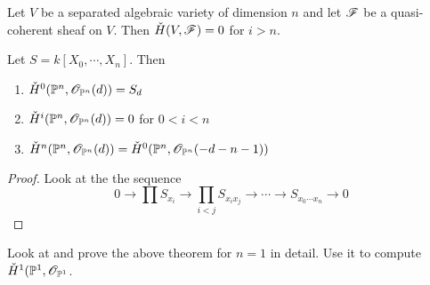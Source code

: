 \begin{theorem}
Let $V$ be a separated algebraic variety of dimension $n$ and let $\mathscr{F}$ be a quasi-coherent sheaf on $V$. Then $\check{H}(V,\mathscr{F})=0$ for $i> n$. 
\end{theorem}

\begin{theorem}
Let $S = k[X_0,\cdots,X_n]$. Then 
\begin{enumerate}
    \item $\check{H}^0(\mathbb{P}^n,\mathscr{O}_{\mathbb{P}^n}(d)) = S_d$
    \item $\check{H}^i(\mathbb{P}^n,\mathscr{O}_{\mathbb{P}^n}(d)) = 0$ for $0<i<n$
    \item $\check{H}^n(\mathbb{P}^n,\mathscr{O}_{\mathbb{P}^n}(d)) = \check{H}^0(\mathbb{P}^n,\mathscr{O}_{\mathbb{P}^n}(-d-n-1))$
\end{enumerate}
\end{theorem}
\begin{proof}
Look at the the sequence
\begin{equation*}
    0\to \prod S_{x_i}\to \prod_{i<j}S_{x_i x_j} \to\cdots\to S_{x_0\cdots x_n}\to 0
\end{equation*}
\end{proof}

\begin{problem}
Look at and prove the above theorem for $n=1$ in detail. Use it to compute $\check{H}^1(\mathbb{P}^1,\mathscr{O}_{\mathbb{P}^1}$. 
\end{problem}